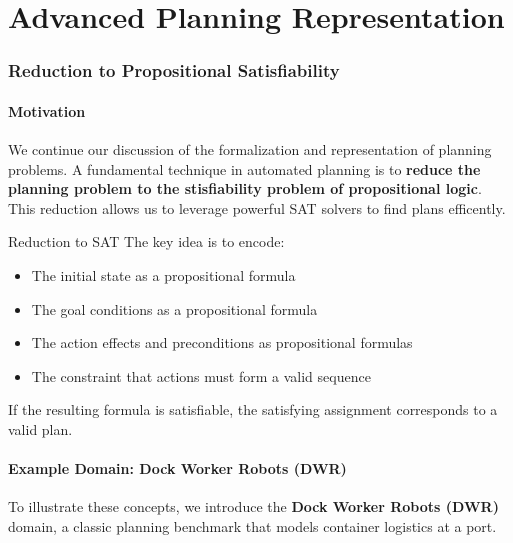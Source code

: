 \documentclass[a4paper]{article}
\theoremstyle{definition}
\begin{document}
\part{Advanced Planning Representation}
\section{Reduction to Propositional Satisfiability}
\subsection{Motivation}
We continue our discussion of the formalization and representation of planning problems.
A fundamental technique in automated planning is to \textbf{reduce the planning problem to the 
stisfiability problem of propositional logic}. This reduction allows us to leverage powerful SAT
solvers to find plans efficently.
\begin{definition}{Reduction to SAT}
The key idea is to encode:
\begin{itemize}
    \item The initial state as a propositional formula
    \item The goal conditions as a propositional formula 
    \item The action effects and preconditions as propositional formulas 
    \item The constraint that actions must form a valid sequence
\end{itemize}
If the resulting formula is satisfiable, the satisfying assignment corresponds to a valid plan.
\end{definition}
\subsection{Example Domain: Dock Worker Robots (DWR)}
To illustrate these concepts, we introduce the \textbf{Dock Worker Robots (DWR)} domain, a classic 
planning benchmark that models container logistics at a port.
\end{document}
